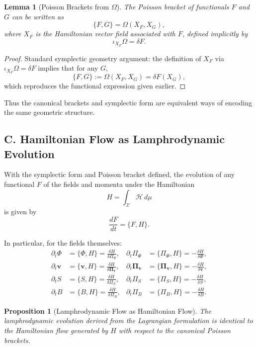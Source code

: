 \documentclass[12pt]{article}
\newtheorem{lemma}{Lemma}
\newtheorem{proposition}{Proposition}
\begin{document}
\begin{lemma}[Poisson Brackets from $\Omega$]
The Poisson bracket of functionals $F$ and $G$ can be written as
\[
\{F,G\} = \Omega(X_F,X_G),
\]
where $X_F$ is the Hamiltonian vector field associated with $F$, defined
implicitly by
\[
\iota_{X_F} \Omega = \delta F.
\]
\end{lemma}

\begin{proof}
Standard symplectic geometry argument: the definition of $X_F$ via
$\iota_{X_F}\Omega=\delta F$ implies that for any $G$,
\[
\{F,G\} := \Omega(X_F,X_G)
= \delta F(X_G),
\]
which reproduces the functional expression given earlier.
\end{proof}

Thus the canonical brackets and symplectic form are equivalent ways of
encoding the same geometric structure.

\subsection*{C. Hamiltonian Flow as Lamphrodynamic Evolution}

With the symplectic form and Poisson bracket defined, the evolution of
any functional $F$ of the fields and momenta under the Hamiltonian
\[
H = \int_{\mathcal{X}}\mathcal{H}\,d\mu
\]
is given by
\[
\frac{dF}{dt} = \{F,H\}.
\]

In particular, for the fields themselves:
\begin{align}
\partial_t \Phi &= \{\Phi,H\} = \frac{\delta H}{\delta \Pi_\Phi}, &
\partial_t \Pi_\Phi &= \{\Pi_\Phi,H\} = -\frac{\delta H}{\delta \Phi},\\[4pt]
\partial_t \mathbf{v} &= \{\mathbf{v},H\} = \frac{\delta H}{\delta \bm{\Pi}_{\mathbf{v}}}, &
\partial_t \bm{\Pi}_{\mathbf{v}} &= \{\bm{\Pi}_{\mathbf{v}},H\} = -\frac{\delta H}{\delta \mathbf{v}},\\[4pt]
\partial_t S &= \{S,H\} = \frac{\delta H}{\delta \Pi_S}, &
\partial_t \Pi_S &= \{\Pi_S,H\} = -\frac{\delta H}{\delta S},\\[4pt]
\partial_t B &= \{B,H\} = \frac{\delta H}{\delta \Pi_B}, &
\partial_t \Pi_B &= \{\Pi_B,H\} = -\frac{\delta H}{\delta B}.
\end{align}

\begin{proposition}[Lamphrodynamic Flow as Hamiltonian Flow]
The lamphrodynamic evolution derived from the Lagrangian formulation is 
identical to the Hamiltonian flow generated by $H$ with respect to the
canonical Poisson brackets.
\end{proposition}
\end{document}
